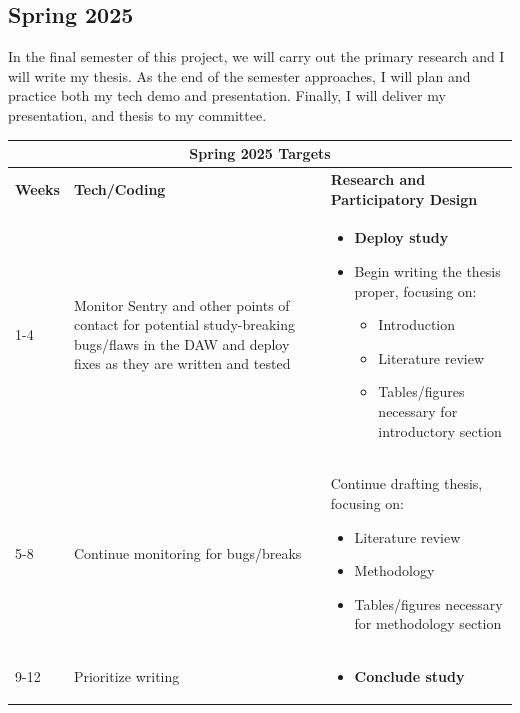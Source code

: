 \documentclass[manuscript,screen,review]{acmart}
\begin{document}
\newpage

\subsection{Spring 2025}
In the final semester of this project, we will carry out the primary research and I will write my thesis. As the end of the semester approaches, I will plan and practice both my tech demo and presentation. Finally, I will deliver my presentation, and thesis to my committee.

\begin{center}
    \begin{tabular}{ |p{1cm}||p{6.5cm}|p{6.5cm}| }
    \hline
    \multicolumn{3}{|c|}{\textbf{Spring 2025 Targets}} \\
    \hline
           \textbf{Weeks}
         & \textbf{Tech/Coding}
         & \textbf{Research and Participatory Design} \\
    \hline
    1-4
    &
    Monitor Sentry and other points of contact for potential study-breaking bugs/flaws in the DAW and deploy fixes as they are written and tested
    &
    \begin{itemize}[leftmargin=*]
        \item \textbf{Deploy study}
        \item Begin writing the thesis proper, focusing on:
        \begin{itemize}
            \item Introduction 
            \item Literature review
            \item Tables/figures necessary for introductory section
        \end{itemize}
    \end{itemize} \\
    \hline
    5-8
    &
    Continue monitoring for bugs/breaks
    &
    Continue drafting thesis, focusing on:
    \begin{itemize}
        \item Literature review
        \item Methodology
        \item Tables/figures necessary for methodology section
    \end{itemize} \\
    \hline
    9-12
    &
    Prioritize writing
    &
    \begin{itemize}[leftmargin=*]
        \item \textbf{Conclude study}

\end{itemize}
\end{tabular}
\end{center}
\end{document}
